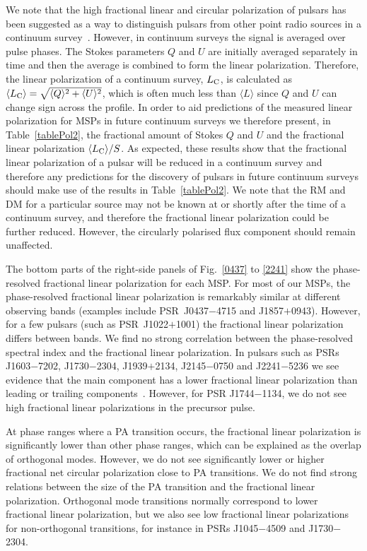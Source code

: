 \documentclass[useAMS,usenatbib]{mn2e}
\begin{document}
We note that the high fractional linear and circular polarization of pulsars has been 
suggested as a way to distinguish pulsars from other point radio sources in a 
continuum survey~\citep[e.g.,][]{Crawford00}. However, in continuum surveys the signal 
is averaged over pulse phases. The Stokes parameters $Q$ and $U$ are initially
averaged separately in time and then the average is combined to form the linear polarization.
%
Therefore, the linear polarization of a continuum survey, $L_{\rm{C}}$, is calculated 
as $\langle L_{\rm{C}}\rangle = \sqrt{\langle Q\rangle^{2}+\langle U\rangle^{2}}$, which 
is often much less than $\langle L\rangle$ since $Q$ and $U$ can change sign across the profile. 
In order to aid predictions of the measured linear polarization for MSPs in future continuum 
surveys we therefore present, in Table~\ref{tablePol2}, the fractional amount of Stokes 
$Q$ and $U$ and the fractional linear polarization $\langle L_{\rm{C}} \rangle/S$.
%
As expected, these results show that the fractional linear polarization of a pulsar will 
be reduced in a continuum survey and therefore any predictions for the discovery of 
pulsars in future continuum surveys should make use of the results in Table~\ref{tablePol2}.
%
We note that the RM and DM for a particular source may not be known at or 
shortly after the time of a continuum survey, and therefore the fractional 
linear polarization could be further reduced. However, the circularly polarised 
flux component should remain unaffected.

The bottom parts of the right-side panels of Fig.~\ref{0437} to \ref{2241} show the 
phase-resolved fractional linear polarization for each MSP. 
%
For most of our MSPs, the phase-resolved fractional linear polarization is remarkably 
similar at different observing bands (examples include PSR~J0437$-$4715 and J1857$+$0943). 
However, for a few pulsars (such as PSR~J1022$+$1001) the fractional linear polarization 
differs between bands. We find no strong correlation between the phase-resolved spectral index 
and the fractional linear polarization. 
%
In pulsars such as PSRs J1603$-$7202, J1730$-$2304, J1939$+$2134, J2145$-$0750 and J2241$-$5236 
we see evidence that the main component has a lower fractional linear polarization 
than leading or trailing components~\citep[e.g.,][]{Basu15}. However, for PSR J1744$-$1134, 
we do not see high fractional linear polarizations in the precursor pulse.
%

At phase ranges where a PA transition occurs, the fractional linear 
polarization is significantly lower than other phase ranges, which can be explained as 
the overlap of orthogonal modes. However, we do not see significantly lower or higher 
fractional net circular polarization close to PA transitions.
%
We do not find strong relations between the size of the PA transition and 
the fractional linear polarization. Orthogonal mode transitions normally correspond 
to lower fractional linear polarization, but we also see low fractional linear 
polarizations for non-orthogonal transitions, for instance in PSRs J1045$-$4509 
and J1730$-$2304. 
%
\end{document}
